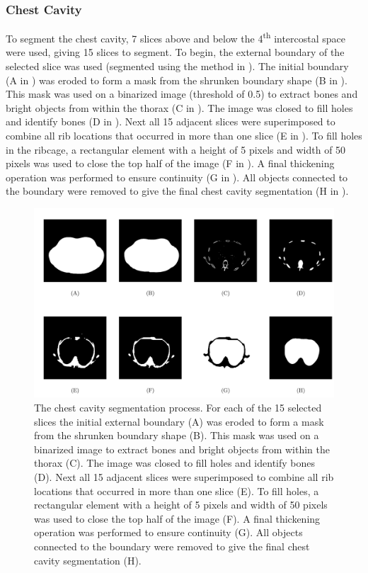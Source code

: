 \subsubsection{Chest Cavity}
To segment the chest cavity, 7 slices above and below the 4\textsuperscript{th}
intercostal space were used, giving 15 slices to segment. 
To begin, the external boundary of the selected slice was
used (segmented using the method in ). 
The initial boundary 
(A in )
was eroded to form a mask from the shrunken boundary shape
(B in ).
This mask was used on a binarized image (threshold of 0.5) to extract bones and bright objects from
within the thorax 
(C in ).
The image was closed to fill  holes and identify bones
(D in ).
Next all 15 adjacent slices were superimposed to combine all rib locations
that occurred in more than one slice
(E in ).
To fill holes in the ribcage, a rectangular 
element with a height of 5 pixels and width of 50 pixels was used to close 
the top half of the image
(F in ).
A final thickening operation was performed to ensure continuity
(G in ).
All objects connected to the boundary were removed 
to give the final chest cavity segmentation
(H in ).

\begin{figure}[H]
	\centering
	\includegraphics[width=\textwidth]{chapter5-CT_to_mesh/imgs/chest_cavity_seg_methods.pdf}
	\caption[Chest cavity segmentation methods.]{\label{fig:cav_seg_methods}%
	The chest cavity segmentation process. For each of the 15 selected slices the initial external boundary (A)
	was eroded to form a mask from the shrunken boundary shape
	(B). This mask was used on a binarized image to extract bones and bright objects from
	within the thorax (C). The image was closed to fill  holes and identify bones
	(D). Next all 15 adjacent slices were superimposed to combine all rib locations
	that occurred in more than one slice (E).
	To fill holes, a rectangular element with a height of 5 pixels and width of 50 pixels was used to close 
	the top half of the image (F).
	A final thickening operation was performed to ensure continuity
	(G). All objects connected to the boundary were removed 
	to give the final chest cavity segmentation (H).
	}
\end{figure}


